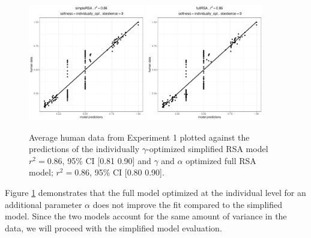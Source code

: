 \documentclass[10pt,a4paper]{article}
\begin{document}
\begin{figure}[ht]
	\centering
	\includegraphics[width=2in]{images/m3.pdf}
	\includegraphics[width=2in]{images/m16.pdf}
	\caption{Average human data from Experiment 1 plotted against the predictions of the individually $\gamma$-optimized simplified RSA model $r^{2}=0.86$, 95\% CI [0.81 0.90] and $\gamma$ and $\alpha$ optimized full RSA model; $r^{2}=0.86$, 95\% CI [0.80 0.90].}\label{simple-full-individual}
\end{figure}

Figure \ref{simple-full-individual} demonstrates that the full model optimized at the individual level for an additional parameter $\alpha$ does not improve the fit compared to the simplified model. Since the two models account for the same amount of variance in the data, we will proceed with the simplified model evaluation.



\end{document}
